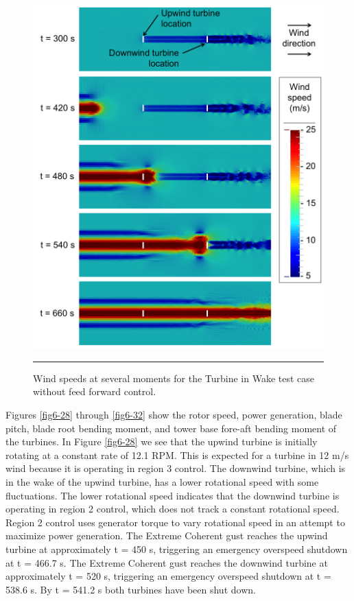  \begin{figure}[htbp] \label{fig6-27} 
	\centering
		\includegraphics[width = \linewidth]{Figures/ch6Figures/fig6-27.png}
		\rule{35em}{0.5pt}
	\caption{Wind speeds at several moments for the Turbine in Wake test case without feed forward control.}
\end{figure}

 Figures \ref{fig6-28} through \ref{fig6-32} show the rotor speed, power generation, blade pitch, blade root bending moment, and tower base fore-aft bending moment of the turbines. In Figure \ref{fig6-28} we see that the upwind turbine is initially rotating at a constant rate of 12.1 RPM. This is expected for a turbine in 12 m/s wind because it is operating in region 3 control. The downwind turbine, which is in the wake of the upwind turbine,  has a lower rotational speed with some fluctuations. The lower rotational speed indicates that the downwind turbine is operating in region 2 control, which does not track a constant rotational speed. Region 2 control uses generator torque to vary rotational speed in an attempt to maximize power generation. The Extreme Coherent gust reaches the upwind turbine at approximately t = 450 s, triggering an emergency overspeed shutdown at t = 466.7 s. The Extreme Coherent gust reaches the downwind turbine at approximately t = 520 s, triggering an emergency overspeed shutdown at t = 538.6 s. By t = 541.2 s both turbines have been shut down.


